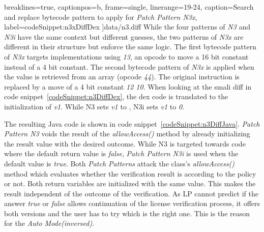  breaklines=true,
 captionpos=b,
 frame=single,
 linerange={19-24},
 caption={Search and replace bytecode pattern to apply for \textit{Patch Pattern N3x}},
 label={codeSnippet:n3xDiffDex}
]{data/n3.diff}
While the four patterns of \textit{N3} and \textit{N3i} have the same context but different guesses, the two patterns of \textit{N3x} are different in their structure but enforce the same logic.
The first bytecode pattern of \textit{N3x} targets implementations using \textit{13}, an opcode to move a 16 bit constant instead of a 4 bit constant.
The second bytecode pattern of \textit{N3x} is applied when the value is retrieved from an array (opcode \textit{44}).
The original instruction is replaced by a move of a 4 bit constant \textit{12 10}.
\newline
\newline
When looking at the smali diff in code snippet~\ref{codeSnippet:n3DiffDex}, the dex code is translated to the initialization of \textit{v1}.
While N3 sets \textit{v1} to , N3i sets \textit{v1} to \textit{0}.


The resulting Java code is shown in code snippet~\ref{codeSnippet:n3DiffJava}.
\textit{Patch Pattern N3} voids the result of the \textit{allowAccess()} method by already initializing the result value with the desired outcome.
While N3 is targeted towards code where the default return value is \textit{false}, \textit{Patch Pattern N3i} is used when the default value is \textit{true}.
\newline
Both \textit{Patch Patterns} attack the class's \textit{allowAccess()} method which evaluates whether the verification result is according to the policy or not.
Both return variables are initialized with the same value.
This makes the result independent of the outcome of the verification.
As LP cannot predict if the answer \textit{true} or \textit{false} allows continuation of the license verification process, it offers both versions and the user has to try which is the right one.
This is the reason for the \textit{Auto Mode(inversed)}.

